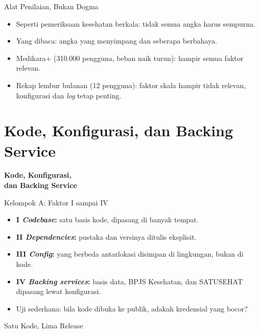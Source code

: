 \documentclass[aspectratio=169, table, 12pt]{beamer}
\begin{document}
\begin{frame}{{\Large Alat Penilaian, Bukan Dogma}}
  \vspace{10pt}
  \begin{itemize}
    \item Seperti pemeriksaan kesehatan berkala: tidak semua angka harus
          sempurna.
    \item Yang dibaca: angka yang menyimpang dan seberapa berbahaya.
    \item Medikara+ (310.000 pengguna, beban naik turun): hampir semua faktor
          relevan.
    \item Rekap lembur bulanan (12 pengguna): faktor skala hampir tidak relevan,
          konfigurasi dan \textit{log} tetap penting.
  \end{itemize}
\end{frame}

\section{Kode, Konfigurasi, dan Backing Service}

\begin{frame}{\hfill}
  \centering
  \Huge{\textbf{Kode, Konfigurasi,\\dan Backing Service}}
\end{frame}

\begin{frame}{{\Large Kelompok A: Faktor I sampai IV}}
  \vspace{10pt}
  \begin{itemize}
    \item \textbf{I \textit{Codebase}:} satu basis kode, dipasang di banyak tempat.
    \item \textbf{II \textit{Dependencies}:} pustaka dan versinya ditulis eksplisit.
    \item \textbf{III \textit{Config}:} yang berbeda antarlokasi disimpan di
          lingkungan, bukan di kode.
    \item \textbf{IV \textit{Backing services}:} basis data, BPJS Kesehatan, dan
          SATUSEHAT dipasang lewat konfigurasi.
    \item Uji sederhana: bila kode dibuka ke publik, adakah kredensial yang bocor?
  \end{itemize}
\end{frame}

\begin{frame}{{\Large Satu Kode, Lima Release}}
  \centering
\end{frame}
\end{document}

